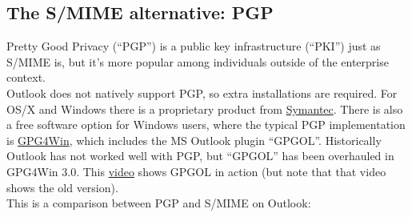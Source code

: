 \documentclass[pdftex,12pt,titlepage=false]{scrartcl}
\begin{document}
\begin{appendices}%
  \begin{minipage}{\textwidth}%
    \section{The S/MIME alternative: PGP}
    Pretty Good Privacy (``PGP'') is a public key infrastructure
    (``PKI'') just as S/MIME is, but it's more popular among
    individuals outside of the enterprise context.\\

    Outlook does not natively support PGP, so extra installations are
    required.  For OS/X and Windows there is a proprietary product
    from
    \href{https://www.symantec.com/products/desktop-email-encryption}{%
      Symantec}.  There is also a free software option for Windows
    users, where the typical PGP implementation is
    \href{https://www.gpg4win.org/version3.html}{GPG4Win}, which
    includes the MS Outlook plugin ``GPGOL''.  Historically Outlook
    has not worked well with PGP, but ``GPGOL'' has been overhauled in
    GPG4Win 3.0.  This
    \href{https://www.youtube.com/watch?v=-TOUeTFUfgQ}{video} shows
    GPGOL in action (but note that that video shows the old version).\\

    This is a comparison between PGP and S/MIME on Outlook:\\[1em]



\end{minipage}
\end{appendices}
\end{document}
